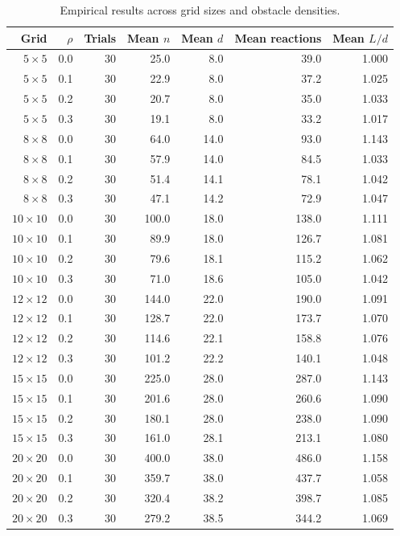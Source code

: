 \documentclass[11pt]{article}
\theoremstyle{plain}
\theoremstyle{definition}
\theoremstyle{remark}
\begin{document}
\begin{table}[ht!]
\centering
\begin{tabular}{rrrrrrr}
\toprule
Grid & $\rho$ & Trials & Mean $n$ & Mean $d$ & Mean reactions & Mean $L/d$ \\
\midrule
$5\times5$ & 0.0 & 30 & 25.0 & 8.0 & 39.0 & 1.000 \\
$5\times5$ & 0.1 & 30 & 22.9 & 8.0 & 37.2 & 1.025 \\
$5\times5$ & 0.2 & 30 & 20.7 & 8.0 & 35.0 & 1.033 \\
$5\times5$ & 0.3 & 30 & 19.1 & 8.0 & 33.2 & 1.017 \\
$8\times8$ & 0.0 & 30 & 64.0 & 14.0 & 93.0 & 1.143 \\
$8\times8$ & 0.1 & 30 & 57.9 & 14.0 & 84.5 & 1.033 \\
$8\times8$ & 0.2 & 30 & 51.4 & 14.1 & 78.1 & 1.042 \\
$8\times8$ & 0.3 & 30 & 47.1 & 14.2 & 72.9 & 1.047 \\
$10\times10$ & 0.0 & 30 & 100.0 & 18.0 & 138.0 & 1.111 \\
$10\times10$ & 0.1 & 30 & 89.9 & 18.0 & 126.7 & 1.081 \\
$10\times10$ & 0.2 & 30 & 79.6 & 18.1 & 115.2 & 1.062 \\
$10\times10$ & 0.3 & 30 & 71.0 & 18.6 & 105.0 & 1.042 \\
$12\times12$ & 0.0 & 30 & 144.0 & 22.0 & 190.0 & 1.091 \\
$12\times12$ & 0.1 & 30 & 128.7 & 22.0 & 173.7 & 1.070 \\
$12\times12$ & 0.2 & 30 & 114.6 & 22.1 & 158.8 & 1.076 \\
$12\times12$ & 0.3 & 30 & 101.2 & 22.2 & 140.1 & 1.048 \\
$15\times15$ & 0.0 & 30 & 225.0 & 28.0 & 287.0 & 1.143 \\
$15\times15$ & 0.1 & 30 & 201.6 & 28.0 & 260.6 & 1.090 \\
$15\times15$ & 0.2 & 30 & 180.1 & 28.0 & 238.0 & 1.090 \\
$15\times15$ & 0.3 & 30 & 161.0 & 28.1 & 213.1 & 1.080 \\
$20\times20$ & 0.0 & 30 & 400.0 & 38.0 & 486.0 & 1.158 \\
$20\times20$ & 0.1 & 30 & 359.7 & 38.0 & 437.7 & 1.058 \\
$20\times20$ & 0.2 & 30 & 320.4 & 38.2 & 398.7 & 1.085 \\
$20\times20$ & 0.3 & 30 & 279.2 & 38.5 & 344.2 & 1.069 \\
\bottomrule
\end{tabular}
\caption{Empirical results across grid sizes and obstacle densities.}
\label{tab:sweep-results}
\end{table}
\end{document}
